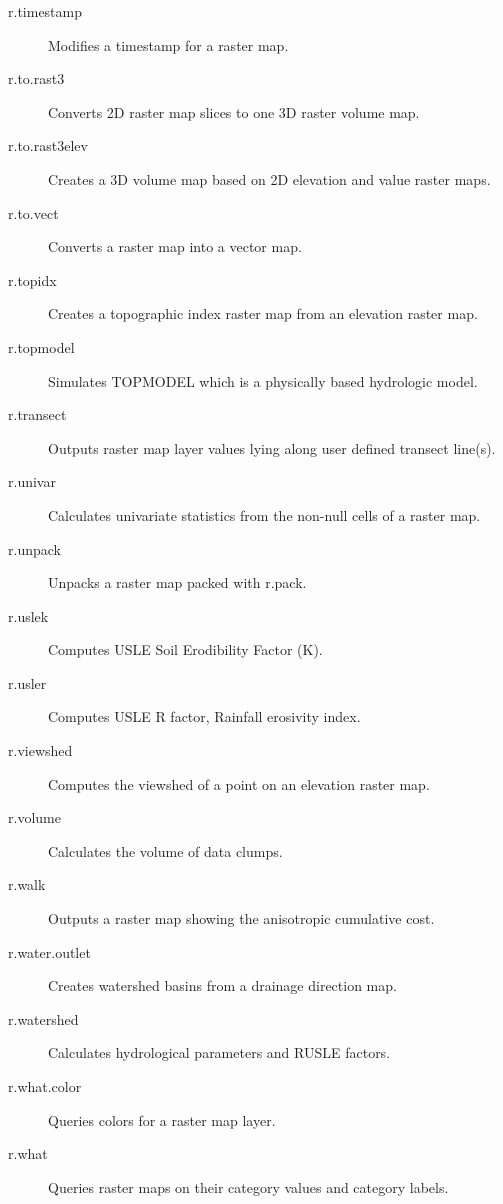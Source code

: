 \begin{description}
\item [{r.timestamp}] Modifies a timestamp for a raster map.
\item [{r.to.rast3}] Converts 2D raster map slices to one 3D raster volume
map.
\item [{r.to.rast3elev}] Creates a 3D volume map based on 2D elevation
and value raster maps.
\item [{r.to.vect}] Converts a raster map into a vector map.
\item [{r.topidx}] Creates a topographic index raster map from an elevation
raster map.
\item [{r.topmodel}] Simulates TOPMODEL which is a physically based hydrologic
model.
\item [{r.transect}] Outputs raster map layer values lying along user defined
transect line(s).
\item [{r.univar}] Calculates univariate statistics from the non-null cells
of a raster map.
\item [{r.unpack}] Unpacks a raster map packed with r.pack.
\item [{r.uslek}] Computes USLE Soil Erodibility Factor (K).
\item [{r.usler}] Computes USLE R factor, Rainfall erosivity index.
\item [{r.viewshed}] Computes the viewshed of a point on an elevation raster
map.
\item [{r.volume}] Calculates the volume of data \textquotedbl{}clumps\textquotedbl{}.
\item [{r.walk}] Outputs a raster map showing the anisotropic cumulative
cost.
\item [{r.water.outlet}] Creates watershed basins from a drainage direction
map.
\item [{r.watershed}] Calculates hydrological parameters and RUSLE factors.
\item [{r.what.color}] Queries colors for a raster map layer.
\item [{r.what}] Queries raster maps on their category values and category
labels.\end{description}

